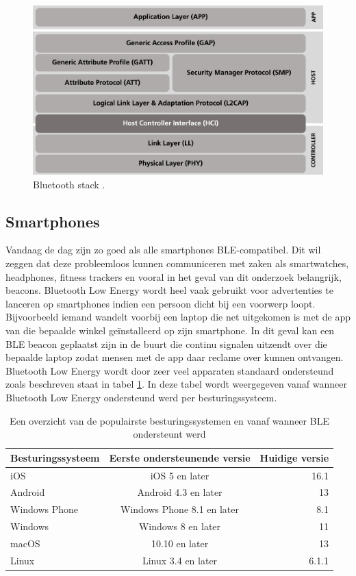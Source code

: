 \begin{figure}
    \includegraphics[width=\linewidth]{blestack.jpg}
    \caption[Bluetooth Stack]{Bluetooth stack \autocite{Caesar2022}.}
    \label{fig:stack}
\end{figure}

\subsection{Smartphones}
Vandaag de dag zijn zo goed als alle smartphones BLE-compatibel. Dit wil zeggen dat deze probleemloos kunnen communiceren met zaken als smartwatches, headphones, fitness trackers en vooral in het geval van dit onderzoek belangrijk, beacons. Bluetooth Low Energy wordt heel vaak gebruikt voor advertenties te lanceren op smartphones indien een persoon dicht bij een voorwerp loopt. Bijvoorbeeld iemand wandelt voorbij een laptop die net uitgekomen is met de app van die bepaalde winkel geïnstalleerd op zijn smartphone. In dit geval kan een BLE beacon geplaatst zijn in de buurt die continu signalen uitzendt over die bepaalde laptop zodat mensen met de app daar reclame over kunnen ontvangen.\\

Bluetooth Low Energy wordt door zeer veel apparaten standaard ondersteund zoals beschreven staat in tabel \ref{tab:os}. In deze tabel wordt weergegeven vanaf wanneer Bluetooth Low Energy ondersteund werd per besturingssysteem.\\

\begin{table}
    \begin{tabular}{l | c | r}
        \hline
        Besturingssysteem & Eerste ondersteunende versie & Huidige versie\\
        \hline
        iOS & iOS 5 en later & 16.1 \\
        Android & Android 4.3 en later & 13 \\
        Windows Phone & Windows Phone 8.1 en later & 8.1\\
        Windows & Windows 8 en later & 11\\
        macOS & 10.10 en later & 13 \\
        Linux & Linux 3.4 en later & 6.1.1 \\
    \end{tabular}
    \caption{Een overzicht van de populairste besturingssystemen en vanaf wanneer BLE ondersteunt werd}
    \label{tab:os}
\end{table}

